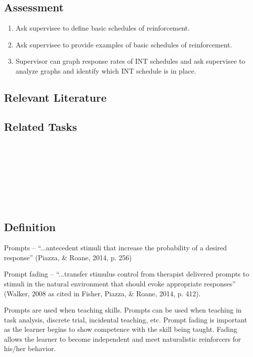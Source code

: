 \subsection{Assessment}
\begin{enumerate}
\item Ask supervisee to define basic schedules of reinforcement.
\item Ask supervisee to provide examples of basic schedules of reinforcement.
\item Supervisor can graph response rates of INT schedules and ask supervisee to analyze graphs and identify which INT schedule is in place.
\end{enumerate}
%
\subsection{Relevant Literature}
\begin{refsection}
\nocite{cooper2007applied,ferster1957schedules}
\printbibliography[heading=none]
\end{refsection}
%
%
\subsection{Related Tasks}
\fourdNineteen{}\\
\fourdTwenty{}\\
\fourdTwentyOne{}\\
\fourFKTwentyOne{}\\
\fourFKFourty{}\\
\fourFKFourtyOne{}\\
%
%
%
%
%
%
%
%
%
%
\section{\fourdThree{}}
\subsection{Definition}
Prompts – ``...antecedent stimuli that increase the probability of a desired response'' (Piazza, \& Roane, 2014, p. 256)

Prompt fading – ``...transfer stimulus control from therapist delivered prompts to stimuli in the natural environment that should evoke appropriate responses'' (Walker, 2008 as cited in Fisher, Piazza, \& Roane, 2014, p. 412).

Prompts are used when teaching skills. Prompts can be used when teaching in task analysis, discrete trial, incidental teaching, etc. Prompt fading is important as the learner begins to show competence with the skill being taught. Fading allows the learner to become independent and meet naturalistic reinforcers for his/her behavior.

